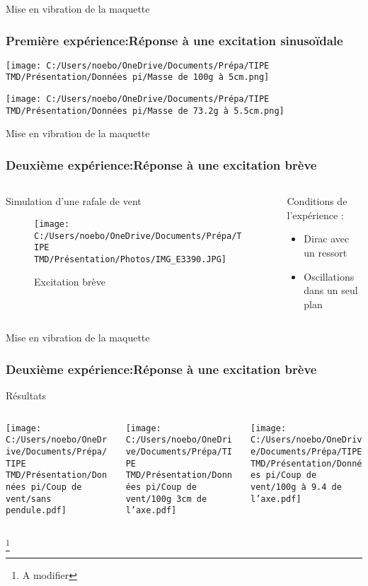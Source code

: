 \documentclass{beamer}
\begin{document}
	\begin{frame}{Mise en vibration de la maquette}
		\frametitle{Première expérience:Réponse à une excitation sinusoïdale}	
		\centering
		\texttt{[image: C:/Users/noebo/OneDrive/Documents/Prépa/TIPE TMD/Présentation/Données pi/Masse de 100g à 5cm.png]}
		
		
		\centering
		\texttt{[image: C:/Users/noebo/OneDrive/Documents/Prépa/TIPE TMD/Présentation/Données pi/Masse de 73.2g à 5.5cm.png]}
		
		
	\end{frame}
	
	
	
	
	\begin{frame}{Mise en vibration de la maquette}
		\frametitle{Deuxième expérience:Réponse à une excitation brève}
		\subtitle{bjr}
		\begin{columns}
			\begin{column}{0.5\textwidth}
				\alert{Simulation d'une rafale de vent}
				\begin{figure}
					\texttt{[image: C:/Users/noebo/OneDrive/Documents/Prépa/TIPE TMD/Présentation/Photos/IMG\_E3390.JPG]}
					\caption{Excitation brève}
				\end{figure}
			\end{column}
			\begin{column}{0.5\textwidth}
				Conditions de l'expérience :
				\begin{itemize}
					\item Dirac avec un ressort 
					\item Oscillations dans un seul plan
				\end{itemize}	
			\end{column}
		\end{columns}
	\end{frame}
	
	
	
	
	\begin{frame}{Mise en vibration de la maquette}
		\frametitle{Deuxième expérience:Réponse à une excitation brève}
		\centering Résultats
		\vspace{12pt}
		\begin{columns}[onlytextwidth]
			\begin{column}{0.33\textwidth}
				\centering
				\texttt{[image: C:/Users/noebo/OneDrive/Documents/Prépa/TIPE TMD/Présentation/Données pi/Coup de vent/sans pendule.pdf]}
			\end{column}
			\begin{column}{0.33\textwidth}
				\centering
				\texttt{[image: C:/Users/noebo/OneDrive/Documents/Prépa/TIPE TMD/Présentation/Données pi/Coup de vent/100g 3cm de l'axe.pdf]}
			\end{column}
			\begin{column}{0.33\textwidth}
				\centering
				\texttt{[image: C:/Users/noebo/OneDrive/Documents/Prépa/TIPE TMD/Présentation/Données pi/Coup de vent/100g à 9.4 de l'axe.pdf]}
			\end{column}
		\end{columns}
		\footnote{A modifier}
	\end{frame}
	
\end{document}
